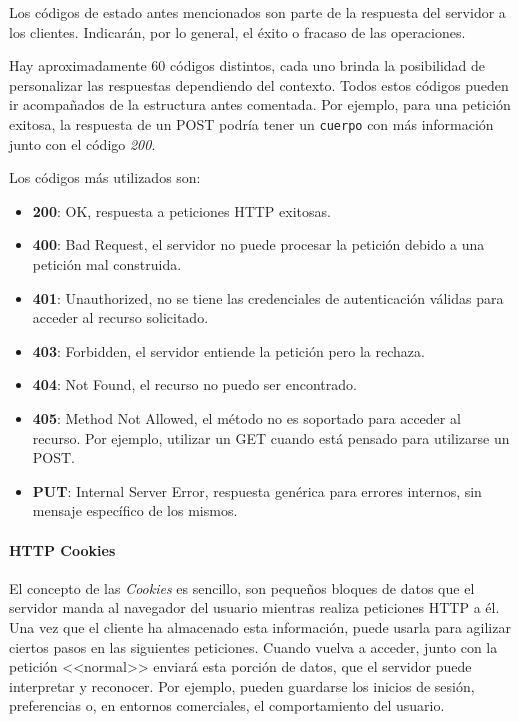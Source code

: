 Los códigos de estado antes mencionados son parte de la respuesta del servidor a
los clientes. Indicarán, por lo general, el éxito o fracaso de las operaciones.

Hay aproximadamente 60 códigos distintos, cada uno brinda la posibilidad de
personalizar las respuestas dependiendo del contexto. Todos estos códigos pueden
ir acompañados de la estructura antes comentada. Por ejemplo, para una petición
exitosa, la respuesta de un POST podría tener un \texttt{cuerpo} con más
información junto con el código \textit{200}. 

Los códigos más utilizados son:

\begin{itemize}
	\item \textbf{200}: OK, respuesta a peticiones HTTP exitosas.
  \item \textbf{400}: Bad Request, el servidor no puede procesar la petición
  debido a una petición mal construida.
  \item \textbf{401}: Unauthorized, no se tiene las credenciales de
  autenticación válidas para acceder al recurso solicitado.
  \item \textbf{403}: Forbidden, el servidor entiende la petición pero la
  rechaza.
  \item \textbf{404}: Not Found, el recurso no puedo ser encontrado.
  \item \textbf{405}: Method Not Allowed, el método no es soportado para acceder
  al recurso. Por ejemplo, utilizar un GET cuando está pensado para utilizarse
  un POST.
  \item \textbf{PUT}: Internal Server Error, respuesta genérica para errores
  internos, sin mensaje específico de los mismos.
\end{itemize}

\paragraph{HTTP Cookies}

El concepto de las \textit{Cookies} es sencillo, son pequeños bloques de datos
que el servidor manda al navegador del usuario mientras realiza peticiones HTTP
a él. Una vez que el cliente ha almacenado esta información, puede usarla para
agilizar ciertos pasos en las siguientes peticiones. Cuando vuelva a acceder,
junto con la petición <<normal>> enviará esta porción de datos, que el servidor
puede interpretar y reconocer. Por ejemplo, pueden guardarse los inicios de
sesión, preferencias o, en entornos comerciales, el comportamiento del usuario.

